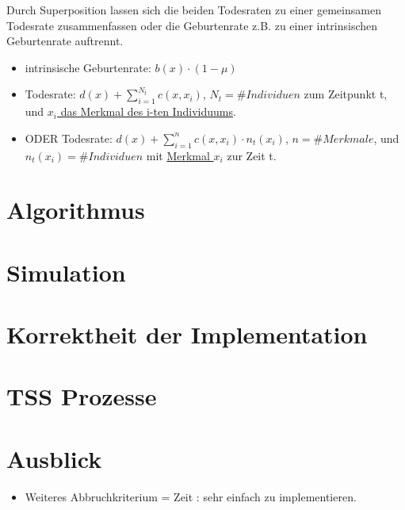\documentclass[11pt, a4paper, german]{article}
\begin{document}
	Durch Superposition lassen sich die beiden Todesraten zu einer gemeinsamen Todesrate zusammenfassen oder die Geburtenrate z.B. zu einer intrinsischen Geburtenrate auftrennt.
	\begin{itemize}
		\item intrinsische Geburtenrate: $ b(x) \cdot (1 - \mu) $
	 	\item Todesrate: $ d(x) + \sum_{i=1}^{N_t} c(x,x_i) $, $ N_t = \#Individuen$ zum Zeitpunkt t, und \underline{$ x_i $ das Merkmal des i-ten Individuums}.
	 	\item ODER Todesrate: $ d(x) + \sum_{i=1}^{n} c(x,x_i) \cdot n_t(x_i) $, $ n = \#Merkmale$, und $ n_t(x_i) = \#Individuen $ mit \underline{Merkmal $ x_i $} zur Zeit t. 
	\end{itemize}

\section{Algorithmus}

\section{Simulation}

\section{Korrektheit der Implementation}

\section{TSS Prozesse}

\section{Ausblick}

\begin{itemize}
	\item Weiteres Abbruchkriterium = Zeit : sehr einfach zu implementieren.
\end{itemize}

\end{document}
